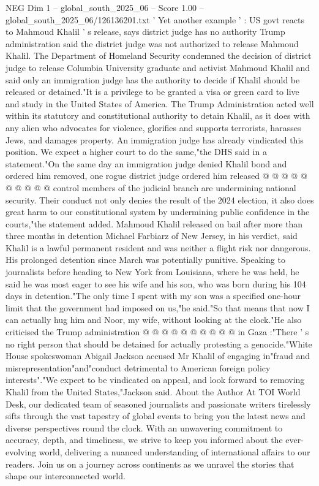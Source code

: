 \begin{textsample}{NEG Dim 1 – global\_south\_2025\_06 – Score 1.00 – global\_south\_2025\_06/126136201.txt}  \label{ex:f1_neg_313}
' Yet another example ' : US govt reacts to Mahmoud Khalil ' s release, says district judge has no authority Trump administration said the district judge was not authorized to release Mahmoud Khalil.
The Department of Homeland Security condemned the decision of district judge to release Columbia University graduate and activist Mahmoud Khalil and said only an immigration judge has the authority to decide if Khalil should be released or detained."It is a privilege to be granted a visa or green card to live and study in the United States of America.
The Trump Administration acted well within its statutory and constitutional authority to detain Khalil, as it does with any alien who advocates for violence, glorifies and supports terrorists, harasses Jews, and damages property.
An immigration judge has already vindicated this position.
We expect a higher court to do the same,"the DHS said in a statement."On the same day an immigration judge denied Khalil bond and ordered him removed, one rogue district judge ordered him released @ @ @ @ @ @ @ @ @ @ control members of the judicial branch are undermining national security.
Their conduct not only denies the result of the 2024 election, it also does great harm to our constitutional system by undermining public confidence in the courts,"the statement added.
Mahmoud Khalil released on bail after more than three months in detention Michael Farbiarz of New Jersey, in his verdict, said Khalil is a lawful permanent resident and was neither a flight risk nor dangerous.
His prolonged detention since March was potentially punitive.
Speaking to journalists before heading to New York from Louisiana, where he was held, he said he was most eager to see his wife and his son, who was born during his 104 days in detention."The only time I spent with my son was a specified one-hour limit that the government had imposed on us,"he said."So that means that now I can actually hug him and Noor, my wife, without looking at the clock."He also criticised the Trump administration @ @ @ @ @ @ @ @ @ @ in Gaza :"There ' s no right person that should be detained for actually protesting a genocide."White House spokeswoman Abigail Jackson accused Mr Khalil of engaging in"fraud and misrepresentation"and"conduct detrimental to American foreign policy interests"."We expect to be vindicated on appeal, and look forward to removing Khalil from the United States,"Jackson said.
About the Author At TOI World Desk, our dedicated team of seasoned journalists and passionate writers tirelessly sifts through the vast tapestry of global events to bring you the latest news and diverse perspectives round the clock.
With an unwavering commitment to accuracy, depth, and timeliness, we strive to keep you informed about the ever-evolving world, delivering a nuanced understanding of international affairs to our readers.
Join us on a journey across continents as we unravel the stories that shape our interconnected world.

\end{textsample}
